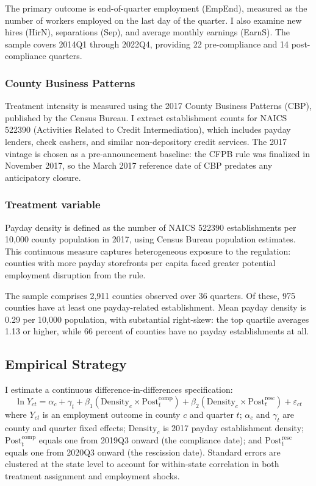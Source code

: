 \documentclass[12pt]{article}
\begin{document}
The primary outcome is end-of-quarter employment (EmpEnd), measured as the number of workers employed on the last day of the quarter. I also examine new hires (HirN), separations (Sep), and average monthly earnings (EarnS). The sample covers 2014Q1 through 2022Q4, providing 22 pre-compliance and 14 post-compliance quarters.

\subsubsection*{County Business Patterns} Treatment intensity is measured using the 2017 County Business Patterns (CBP), published by the Census Bureau. I extract establishment counts for NAICS 522390 (Activities Related to Credit Intermediation), which includes payday lenders, check cashers, and similar non-depository credit services. The 2017 vintage is chosen as a pre-announcement baseline: the CFPB rule was finalized in November 2017, so the March 2017 reference date of CBP predates any anticipatory closure.

\subsubsection*{Treatment variable} Payday density is defined as the number of NAICS 522390 establishments per 10,000 county population in 2017, using Census Bureau population estimates. This continuous measure captures heterogeneous exposure to the regulation: counties with more payday storefronts per capita faced greater potential employment disruption from the rule.



The sample comprises 2,911 counties observed over 36 quarters. Of these, 975 counties have at least one payday-related establishment. Mean payday density is 0.29 per 10,000 population, with substantial right-skew: the top quartile averages 1.13 or higher, while 66 percent of counties have no payday establishments at all.

\subsection{Empirical Strategy}

I estimate a continuous difference-in-differences specification:
\begin{equation}
\ln Y_{ct} = \alpha_c + \gamma_t + \beta_1 (\text{Density}_c \times \text{Post}^{\text{comp}}_t) + \beta_2 (\text{Density}_c \times \text{Post}^{\text{resc}}_t) + \varepsilon_{ct}
\label{eq:main}
\end{equation}
where $Y_{ct}$ is an employment outcome in county $c$ and quarter $t$; $\alpha_c$ and $\gamma_t$ are county and quarter fixed effects; $\text{Density}_c$ is 2017 payday establishment density; $\text{Post}^{\text{comp}}_t$ equals one from 2019Q3 onward (the compliance date); and $\text{Post}^{\text{resc}}_t$ equals one from 2020Q3 onward (the rescission date). Standard errors are clustered at the state level to account for within-state correlation in both treatment assignment and employment shocks.
\end{document}
